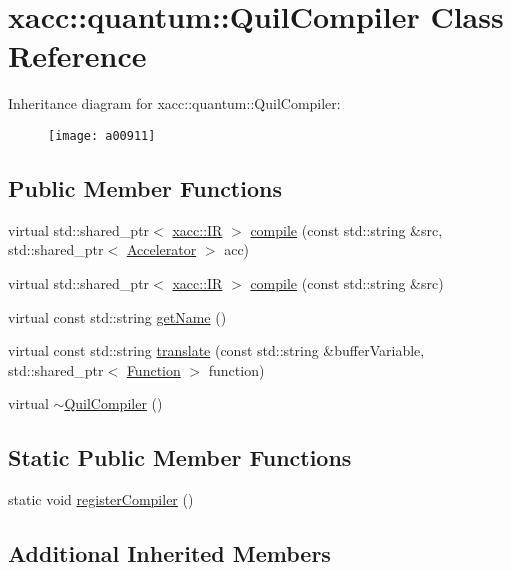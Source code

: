 \hypertarget{a00911}{}\section{xacc\+:\+:quantum\+:\+:Quil\+Compiler Class Reference}
\label{a00911}
Inheritance diagram for xacc\+:\+:quantum\+:\+:Quil\+Compiler\+:\begin{figure}[H]
\begin{center}
\leavevmode
\texttt{[image: a00911]}
\end{center}
\end{figure}
\subsection*{Public Member Functions}
\begin{DoxyCompactItemize}
\item 
virtual std\+::shared\+\_\+ptr$<$ \hyperlink{a01151}{xacc\+::\+IR} $>$ \hyperlink{a00911_a2421482415ca4e09963ea4ecddff8100}{compile} (const std\+::string \&src, std\+::shared\+\_\+ptr$<$ \hyperlink{a01087}{Accelerator} $>$ acc)
\item 
virtual std\+::shared\+\_\+ptr$<$ \hyperlink{a01151}{xacc\+::\+IR} $>$ \hyperlink{a00911_adf4d321ecb0df3fa7728999f941c83b2}{compile} (const std\+::string \&src)
\item 
virtual const std\+::string \hyperlink{a00911_ae7d52140b6dd52730edc6e38ae48f437}{get\+Name} ()
\item 
virtual const std\+::string \hyperlink{a00911_a66ca00bbb1f30e7bc6dd86b1e267b93b}{translate} (const std\+::string \&buffer\+Variable, std\+::shared\+\_\+ptr$<$ \hyperlink{a01127}{Function} $>$ function)
\item 
virtual \hyperlink{a00911_a0866a9f695f28c90ac1f4754374f3bfe}{$\sim$\+Quil\+Compiler} ()
\end{DoxyCompactItemize}
\subsection*{Static Public Member Functions}
\begin{DoxyCompactItemize}
\item 
static void \hyperlink{a00911_aaec99a14bede717bf02a0f65af2a3c69}{register\+Compiler} ()
\end{DoxyCompactItemize}
\subsection*{Additional Inherited Members}


